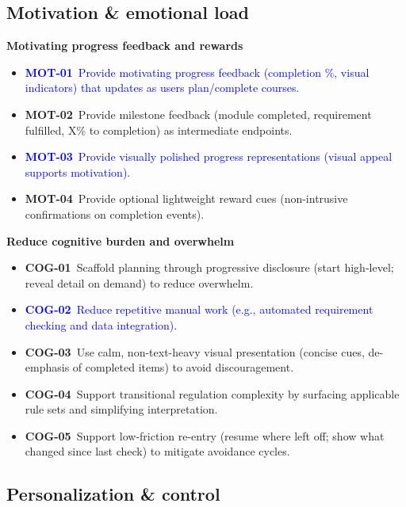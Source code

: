 \subsection*{Motivation \& emotional load}

\textbf{Motivating progress feedback and rewards}
\begin{itemize}
  \item \textcolor{blue}{\textbf{MOT-01}~Provide motivating progress feedback (completion \%, visual indicators) that updates as users plan/complete courses.}
  \item \textbf{MOT-02}~Provide milestone feedback (module completed, requirement fulfilled, X\% to completion) as intermediate endpoints.
  \item \textcolor{blue}{\textbf{MOT-03}~Provide visually polished progress representations (visual appeal supports motivation).}
  \item \textbf{MOT-04}~Provide optional lightweight reward cues (non-intrusive confirmations on completion events).
\end{itemize}

\textbf{Reduce cognitive burden and overwhelm}
\begin{itemize}
  \item \textbf{COG-01}~Scaffold planning through progressive disclosure (start high-level; reveal detail on demand) to reduce overwhelm.
  \item \textcolor{blue}{\textbf{COG-02}~Reduce repetitive manual work (e.g., automated requirement checking and data integration).}
  \item \textbf{COG-03}~Use calm, non-text-heavy visual presentation (concise cues, de-emphasis of completed items) to avoid discouragement.
  \item \textbf{COG-04}~Support transitional regulation complexity by surfacing applicable rule sets and simplifying interpretation.
  \item \textbf{COG-05}~Support low-friction re-entry (resume where left off; show what changed since last check) to mitigate avoidance cycles.
\end{itemize}


\subsection*{Personalization \& control}

